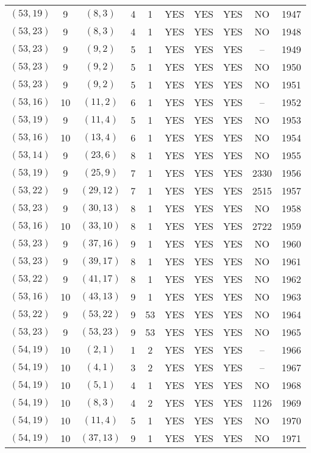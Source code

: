 \begin{longtable}{|c|c|c|c|c|c|c|c|c|c|}
$(53, 19)$ & 9 & $(8, 3)$ & 4 & 1 & YES & YES & YES & NO & 1947\\
$(53, 23)$ & 9 & $(8, 3)$ & 4 & 1 & YES & YES & YES & NO & 1948\\
$(53, 23)$ & 9 & $(9, 2)$ & 5 & 1 & YES & YES & YES & -- & 1949\\
$(53, 23)$ & 9 & $(9, 2)$ & 5 & 1 & YES & YES & YES & NO & 1950\\
$(53, 23)$ & 9 & $(9, 2)$ & 5 & 1 & YES & YES & YES & NO & 1951\\
$(53, 16)$ & 10 & $(11, 2)$ & 6 & 1 & YES & YES & YES & -- & 1952\\
$(53, 19)$ & 9 & $(11, 4)$ & 5 & 1 & YES & YES & YES & NO & 1953\\
$(53, 16)$ & 10 & $(13, 4)$ & 6 & 1 & YES & YES & YES & NO & 1954\\
$(53, 14)$ & 9 & $(23, 6)$ & 8 & 1 & YES & YES & YES & NO & 1955\\
$(53, 19)$ & 9 & $(25, 9)$ & 7 & 1 & YES & YES & YES & 2330 & 1956\\
$(53, 22)$ & 9 & $(29, 12)$ & 7 & 1 & YES & YES & YES & 2515 & 1957\\
$(53, 23)$ & 9 & $(30, 13)$ & 8 & 1 & YES & YES & YES & NO & 1958\\
$(53, 16)$ & 10 & $(33, 10)$ & 8 & 1 & YES & YES & YES & 2722 & 1959\\
$(53, 23)$ & 9 & $(37, 16)$ & 9 & 1 & YES & YES & YES & NO & 1960\\
$(53, 23)$ & 9 & $(39, 17)$ & 8 & 1 & YES & YES & YES & NO & 1961\\
$(53, 22)$ & 9 & $(41, 17)$ & 8 & 1 & YES & YES & YES & NO & 1962\\
$(53, 16)$ & 10 & $(43, 13)$ & 9 & 1 & YES & YES & YES & NO & 1963\\
$(53, 22)$ & 9 & $(53, 22)$ & 9 & 53 & YES & YES & YES & NO & 1964\\
$(53, 23)$ & 9 & $(53, 23)$ & 9 & 53 & YES & YES & YES & NO & 1965\\
$(54, 19)$ & 10 & $(2, 1)$ & 1 & 2 & YES & YES & YES & -- & 1966\\
$(54, 19)$ & 10 & $(4, 1)$ & 3 & 2 & YES & YES & YES & -- & 1967\\
$(54, 19)$ & 10 & $(5, 1)$ & 4 & 1 & YES & YES & YES & NO & 1968\\
$(54, 19)$ & 10 & $(8, 3)$ & 4 & 2 & YES & YES & YES & 1126 & 1969\\
$(54, 19)$ & 10 & $(11, 4)$ & 5 & 1 & YES & YES & YES & NO & 1970\\
$(54, 19)$ & 10 & $(37, 13)$ & 9 & 1 & YES & YES & YES & NO & 1971\\

\end{longtable}
